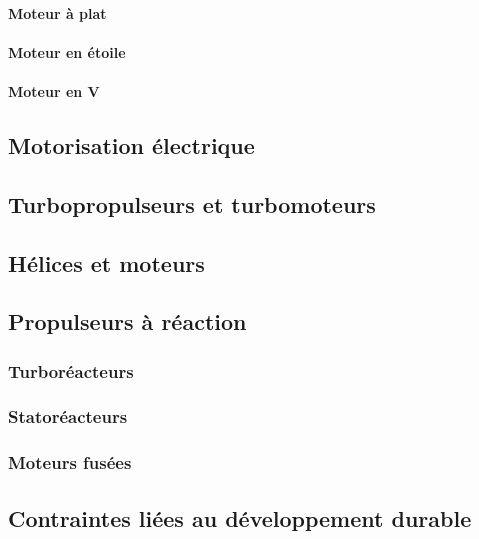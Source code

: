	\paragraph{Moteur à plat}
	
	\paragraph{Moteur en étoile}
	
	\paragraph{Moteur en V}
	
	\subsection{Motorisation électrique}
	
	\subsection{Turbopropulseurs et turbomoteurs}
	
	\subsection{Hélices et moteurs}
	
	\subsection{Propulseurs à réaction}
		\subsubsection{Turboréacteurs}
	
		\subsubsection{Statoréacteurs}
	
		\subsubsection{Moteurs fusées}
		
	\subsection{Contraintes liées au développement durable}

